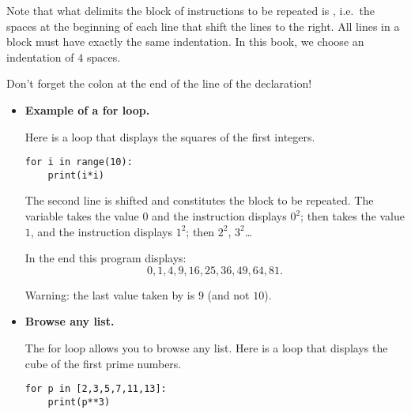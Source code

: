 \documentclass[11pt,class=report,crop=false]{standalone}
\begin{document}
\begin{cours}



\vspace*{1ex}



Note that what delimits the block of instructions to be repeated is , i.e.~the spaces at the beginning of each line that shift the lines to the right.
All lines in a block must have exactly the same indentation. In this book, we choose an indentation of $4$ spaces.

Don't forget the colon \og{}\ci{:}\fg{} at the end of the line of the  declaration!

\begin{itemize}
  \item \textbf{Example of a \og{}for\fg{} loop.}

Here is a loop that displays the squares of the first integers. 
\begin{center}
\begin{minipage}{0.5\textwidth} 
\begin{lstlisting}
for i in range(10):
    print(i*i)
\end{lstlisting}
\end{minipage}
\end{center} 
The second line is shifted and constitutes the block to be repeated.
The variable  takes the value $0$ and the instruction displays $0^2$;
then  takes the value $1$, and the instruction displays $1^2$; then $2^2$, $3^2$\ldots

In the end this program displays:
$$0,1,4,9,16,25,36,49,64,81.$$

Warning: the last value taken by  is $9$ (and not $10$).

  \item \textbf{Browse any list.}
  
The \og{}for\fg{} loop allows you to browse any list. Here is a loop that displays the cube of the first prime numbers.
\begin{center}
\begin{minipage}{0.5\textwidth} 
\begin{lstlisting}
for p in [2,3,5,7,11,13]:
    print(p**3)
\end{lstlisting}
\end{minipage}
\end{center} 


\end{itemize}
\end{cours}
\end{document}

